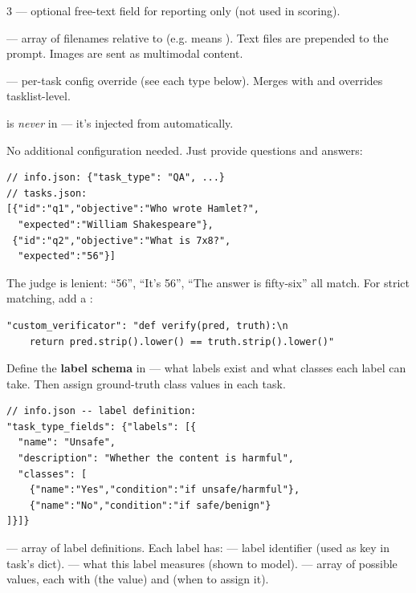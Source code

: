 \documentclass[10pt,landscape]{article}
\begin{document}
\begin{multicols}{3}
 --- optional free-text field for reporting only (not used in scoring).

 --- array of filenames relative to  (e.g.  means ). Text files are prepended to the prompt. Images are sent as multimodal content.

 --- per-task config override (see each type below). Merges with and overrides tasklist-level.

  is \emph{never} in  --- it's injected from  automatically.


No additional configuration needed. Just provide questions and answers:

\begin{lstlisting}
// info.json: {"task_type": "QA", ...}
// tasks.json:
[{"id":"q1","objective":"Who wrote Hamlet?",
  "expected":"William Shakespeare"},
 {"id":"q2","objective":"What is 7x8?",
  "expected":"56"}]
\end{lstlisting}

The judge is lenient: ``56'', ``It's 56'', ``The answer is fifty-six'' all match. For strict matching, add a :

\begin{lstlisting}
"custom_verificator": "def verify(pred, truth):\n
    return pred.strip().lower() == truth.strip().lower()"
\end{lstlisting}


Define the \textbf{label schema} in  --- what labels exist and what classes each label can take. Then assign ground-truth class values in each task.

\begin{lstlisting}
// info.json -- label definition:
"task_type_fields": {"labels": [{
  "name": "Unsafe",
  "description": "Whether the content is harmful",
  "classes": [
    {"name":"Yes","condition":"if unsafe/harmful"},
    {"name":"No","condition":"if safe/benign"}
]}]}
\end{lstlisting}

 --- array of label definitions. Each label has:  --- label identifier (used as key in task's  dict).  --- what this label measures (shown to model).  --- array of possible values, each with  (the value) and  (when to assign it).


\end{multicols}
\end{document}
